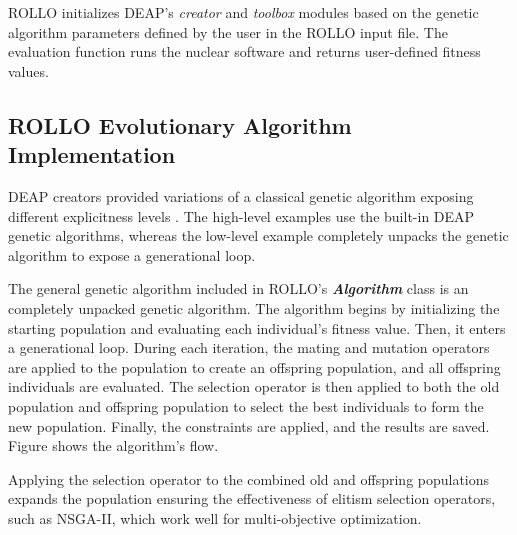 \gls{ROLLO} initializes \gls{DEAP}'s \textit{creator} and \textit{toolbox} modules 
based on the genetic algorithm parameters defined by the user in the \gls{ROLLO} 
input file. 
The evaluation function runs the nuclear software and returns user-defined 
fitness values. 

\subsection{ROLLO Evolutionary Algorithm Implementation}
\gls{DEAP} creators provided variations of a classical genetic algorithm 
exposing different explicitness levels \cite{fortin_deap_2012}. 
The high-level examples use the built-in \gls{DEAP} genetic algorithms, 
whereas the low-level example completely unpacks the genetic algorithm to expose 
a generational loop. 

The general genetic algorithm included in ROLLO's \textbf{\textit{Algorithm}} class 
is an completely unpacked genetic algorithm. 
The algorithm begins by initializing the starting population and evaluating 
each individual's fitness value. 
Then, it enters a generational loop. 
During each iteration, the mating and mutation operators are applied to the population
to create an offspring population, and all offspring individuals are evaluated. 
The selection operator is then applied to both the old population 
and offspring population to select the best individuals to form 
the new population. 
Finally, the constraints are applied, and the results are saved.
Figure \label{fig:genetic_alg_nuclear} shows the algorithm's flow. 

Applying the selection operator to the combined old and offspring 
populations expands the population ensuring the effectiveness of 
elitism selection operators, such as NSGA-II, which work well 
for multi-objective optimization. 


